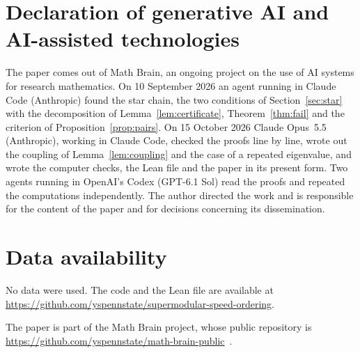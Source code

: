 \documentclass[11pt]{amsart}
\theoremstyle{remark}
\numberwithin{equation}{section}
\newcommand{\1}{\mathbf 1}
\begin{document}
\section*{Declaration of generative AI and AI-assisted technologies}
The paper comes out of Math Brain, an ongoing project on the use of AI systems for research mathematics. On 10 September 2026 an agent running in Claude Code (Anthropic) found the star chain, the two conditions of Section~\ref{sec:star} with the decomposition of Lemma~\ref{lem:certificate}, Theorem~\ref{thm:fail} and the criterion of Proposition~\ref{prop:pairs}. On 15 October 2026 Claude Opus~5.5 (Anthropic), working in Claude Code, checked the proofs line by line, wrote out the coupling of Lemma~\ref{lem:coupling} and the case of a repeated eigenvalue, and wrote the computer checks, the Lean file and the paper in its present form. Two agents running in OpenAI's Codex (GPT-6.1 Sol) read the proofs and repeated the computations independently. The author directed the work and is responsible for the content of the paper and for decisions concerning its dissemination.

\section*{Data availability}
No data were used. The code and the Lean file are available at\\ \url{https://github.com/yspennstate/supermodular-speed-ordering}.

The paper is part of the Math Brain project, whose public repository is \url{https://github.com/yspennstate/math-brain-public}~\cite{MathBrainRepo}.
\end{document}
